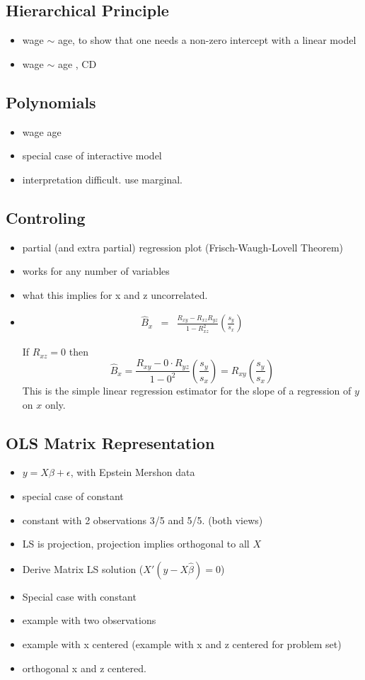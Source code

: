\documentclass[10pt,letter]{article}
\newcommand{\bi}{\begin{itemize}}
\newcommand{\ei}{\end{itemize}}
\begin{document}
\subsection*{Hierarchical Principle}
\bi
\item wage $\sim$ age, to show that one needs a non-zero intercept with a linear model
\item wage $\sim$ age , CD
\ei

\subsection*{Polynomials}

\bi
\item wage age
\item special case of interactive model
\item interpretation difficult. use marginal.
\ei

\subsection*{Controling}
\bi
\item partial (and extra partial) regression plot (Frisch-Waugh-Lovell Theorem)
\item works for any number of variables
\item what this implies for x and z uncorrelated.


\item 
\begin{eqnarray*}
\hat{B}_{x} & = & \frac{R_{xy} - R_{xz}R_{yz}}{1-R_{xz}^2}(\frac{s_y}{s_x})
\end{eqnarray*}

\noindent If $R_{xz} = 0$ then 
$$\hat{B}_{x} = \frac{R_{xy} - 0\cdot R_{yz}}{1-0^2}(\frac{s_y}{s_x}) = 
R_{xy}(\frac{s_y}{s_x})$$
\noindent This is the simple linear regression estimator for the slope of a regression of $y$ on $x$ only.    

\ei


\subsection*{OLS Matrix Representation}
\bi
\item $y = X\beta + \epsilon$, with Epstein Mershon data
\item special case of constant 
\item constant with 2 observations 3/5 and 5/5. (both views)
\item LS is projection, projection implies orthogonal to all $X$
\item Derive Matrix LS solution ($X' (y - X\hat{\beta}) = 0$)
\item Special case with constant
\item example with two observations
\item example with x centered (example with x and z centered for problem set)
\item orthogonal x and z centered.
\ei
\end{document}

